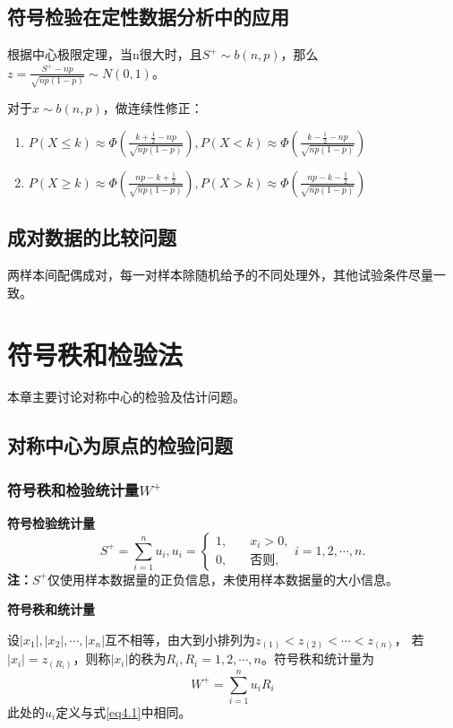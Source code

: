 \documentclass[lang=cn,10pt]{elegantbook}
\begin{document}
\section{符号检验在定性数据分析中的应用}
根据中心极限定理，当n很大时，且$S^+ \sim b(n,p)$，那么$z=\frac{S^+ - np}{\sqrt{np(1-p)}}\sim N(0,1)$。

对于$x\sim b(n,p)$，做连续性修正：
\begin{enumerate}[1、]
    \item $P(X\leq k)\approx\Phi(\frac{k+\frac12-np}{\sqrt{np(1-p)}}),
              P(X< k)\approx\Phi(\frac{k-\frac12-np}{\sqrt{np(1-p)}})$
    \item $P(X\geq k)\approx\Phi(\frac{np-k+\frac12}{\sqrt{np(1-p)}}),
              P(X> k)\approx\Phi(\frac{np-k-\frac12}{\sqrt{np(1-p)}})$
\end{enumerate}

\section{成对数据的比较问题}
\begin{definition}[配对数据]
    两样本间配偶成对，每一对样本除随机给予的不同处理外，其他试验条件尽量一致。
\end{definition}

\chapter{符号秩和检验法}
本章主要讨论对称中心的检验及估计问题。
\section{对称中心为原点的检验问题}
\subsection{符号秩和检验统计量$W^+$}
\textbf{符号检验统计量}
\begin{equation}\label{eq4.1}
    S^+=\sum_{i=1}^nu_i,u_i=
    \begin{cases}1,\quad & x_i>0,       \\
             0,\quad & \text{否则,}
    \end{cases}i=1,2,\cdots,n.
\end{equation}
\textbf{注：}$S^+$仅使用样本数据量的正负信息，未使用样本数据量的大小信息。

\textbf{符号秩和统计量}

设$|x_1|,|x_2|,\cdots,|x_n|$互不相等，由大到小排列为$z_{(1)}<z_{(2)}<\cdots<z_{(n)}$，
若$|x_i|=z_{(R_i)}$，则称$|x_i|$的秩为$R_i,R_{i}=1,2,\cdots,n$。符号秩和统计量为
\begin{equation}
    W^+=\sum_{i=1}^nu_iR_i
\end{equation}
此处的$u_i$定义与式\ref{eq4.1}中相同。
\end{document}
